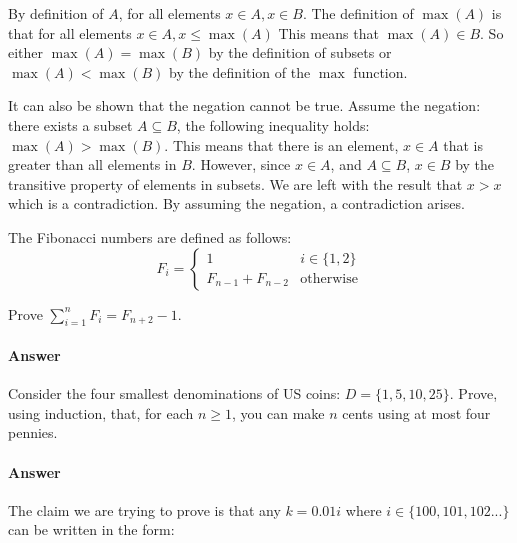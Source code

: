 \documentclass{article}
\begin{document}
By definition of $A$, for all elements $x \in A, x\in B$. The definition of $\max(A)$ is that for all elements $x \in A, x \leq \max(A)$
This means that $\max(A) \in B$. So either $\max(A) = \max(B)$ by the definition of subsets or $ \max(A) < \max(B)$ by the definition of the $\max$ function.

It can also be shown that the negation cannot be true. Assume the negation: there exists a subset  $A \subseteq B$, the following inequality
holds: $\max(A) > \max(B)$. This means that there is an element, $x \in A$ that is greater than all elements in $B$. However, since $x \in A$,
 and $A \subseteq B$, $x \in B$ by the transitive property of elements in subsets. We are left with the result that $x>x$ which is a contradiction. 
 By assuming the negation, a contradiction arises.

\collab{\todo{}} 

The Fibonacci numbers are defined as follows:
$$
    F_i = \begin{cases}
            1 & i \in \{1,2\} \\
            F_{n-1}+F_{n-2} & \text{otherwise}
          \end{cases}
$$

Prove $\sum_{i=1}^n F_i = F_{n+2}-1$.

\paragraph{Answer}


 

Consider the four smallest denominations of US coins: $D=\{1,5,10,25\}$.  Prove, using
induction, that, for each $n \geq 1$, you can make $n$ cents using at most four
pennies.

\paragraph{Answer}
The claim we are trying to prove is that any $k = 0.01i$ where $i \in \{100, 101, 102...\}$ can be written in the form:
\end{document}
